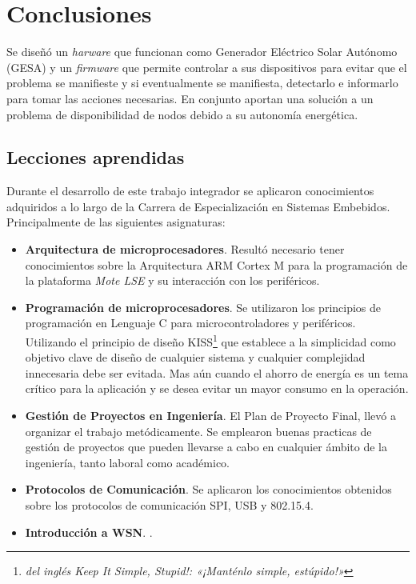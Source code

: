 
\chapter{Conclusiones} %

\label{Chapter5} %

Se diseñó un \textit{harware} que funcionan como Generador Eléctrico Solar Autónomo (GESA) y un \textit{firmware} que permite controlar a sus dispositivos para evitar que el problema se manifieste y si eventualmente se manifiesta, detectarlo e informarlo para tomar las acciones necesarias. En conjunto aportan una solución a un problema de disponibilidad de nodos debido a su autonomía energética.


\section{Lecciones aprendidas}

\medskip
Durante el desarrollo de este trabajo integrador se aplicaron conocimientos adquiridos a lo largo de la Carrera de Especialización en Sistemas Embebidos. Principalmente de las siguientes asignaturas: 

\begin{itemize}
\item
\textbf{Arquitectura de microprocesadores}. Resultó necesario tener conocimientos sobre la Arquitectura ARM Cortex M para la programación de la plataforma \textit{Mote LSE} y su interacción con los periféricos.

\item
\textbf{Programación de microprocesadores}. Se utilizaron los principios de programación en Lenguaje C para microcontroladores y periféricos. Utilizando el principio de diseño KISS\footnote{\textit{del inglés Keep It Simple, Stupid!: «¡Manténlo simple, estúpido!»}} que establece a la simplicidad como objetivo clave de diseño de cualquier sistema y cualquier complejidad innecesaria debe ser evitada. Mas aún cuando el ahorro de energía es un tema crítico para la aplicación y se desea evitar un mayor consumo en la operación. 

\item
\textbf{Gestión de Proyectos en Ingeniería}. El Plan de Proyecto Final, llevó a organizar el trabajo metódicamente. Se emplearon buenas practicas de gestión de proyectos que pueden llevarse a cabo en cualquier ámbito de la ingeniería, tanto laboral como académico.

\item 
\textbf{Protocolos de Comunicación}. Se aplicaron los conocimientos obtenidos sobre los protocolos de comunicación SPI, USB y 802.15.4.

\item 
\textbf{Introducción a WSN}. .
\end{itemize}

